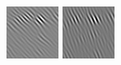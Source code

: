 \begin{figure}
\begin{center}
  \includegraphics[width=\columnwidth/9]{ch4/figures/imag_0_6.jpg}
  \includegraphics[width=\columnwidth/9]{ch4/figures/imag_0_7.jpg}\\

\end{center}
\end{figure}
